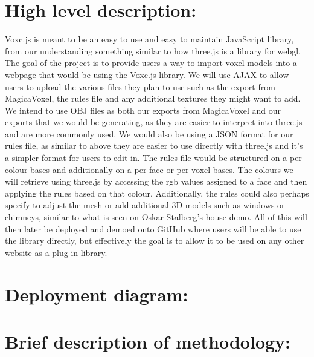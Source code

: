 \documentclass[english]{article}
\begin{document}
	\section{High level description:}
	Voxc.js is meant to be an easy to use and easy to maintain JavaScript library, from our understanding something similar to how three.js is a library for webgl. The goal of the project is to provide users a way to import voxel models into a webpage that would be using the Voxc.js library.
		\newline
	\newline
	We will use AJAX to allow users to upload the various files they plan to use such as the export from MagicaVoxel, the rules file and any additional textures they might want to add.
	\newline
\newline
	We intend to use OBJ files as both our exports from MagicaVoxel and our exports that we would be generating, as they are easier to interpret into three.js and are more commonly used. We would also be using a JSON format for our rules file, as similar to above they are easier to use directly with three.js and it’s a simpler format for users to edit in.
	\newline
\newline
	The rules file would be structured on a per colour bases and additionally on a per face or per voxel bases. The colours we will retrieve using three.js by accessing the rgb values assigned to a face and then applying the rules based on that colour. Additionally, the rules could also perhaps specify to adjust the mesh or add additional 3D models such as windows or chimneys, similar to what is seen on Oskar Stalberg’s house demo.
	\newline
\newline
	All of this will then later be deployed and demoed onto GitHub where users will be able to use the library directly, but effectively the goal is to allow it to be used on any other website as a plug-in library.
	\medskip
	
	\section{Deployment diagram:}
	\medskip
	\section{Brief description of methodology:}
	
\end{document}
